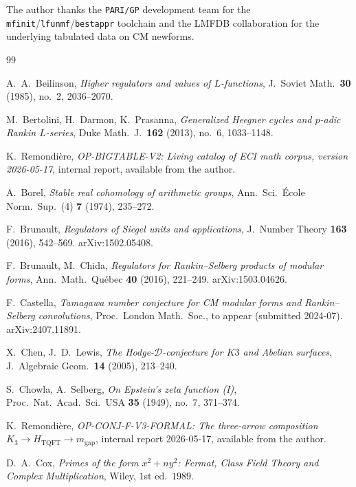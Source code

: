 \documentclass[11pt,a4paper]{amsart}
\theoremstyle{plain}
\theoremstyle{definition}
\begin{document}
The author thanks the \texttt{PARI/GP} development team for the
\texttt{mfinit}/\texttt{lfunmf}/\texttt{bestappr} toolchain and the
LMFDB collaboration for the underlying tabulated data on CM
newforms.

\begin{thebibliography}{99}

A.\ A.\ Beilinson,
\emph{Higher regulators and values of $L$-functions},
J.\ Soviet Math.\ \textbf{30} (1985), no.\ 2, 2036--2070.

M.\ Bertolini, H.\ Darmon, K.\ Prasanna,
\emph{Generalized Heegner cycles and $p$-adic Rankin $L$-series},
Duke Math.\ J.\ \textbf{162} (2013), no.\ 6, 1033--1148.

K.\ Remondi\`ere,
\emph{OP-BIGTABLE-V2: Living catalog of ECI math corpus, version
2026-05-17}, internal report, available from the author.

A.\ Borel,
\emph{Stable real cohomology of arithmetic groups},
Ann.\ Sci.\ \'Ecole Norm.\ Sup.\ (4) \textbf{7} (1974), 235--272.

F.\ Brunault,
\emph{Regulators of Siegel units and applications},
J.\ Number Theory \textbf{163} (2016), 542--569. arXiv:1502.05408.

F.\ Brunault, M.\ Chida,
\emph{Regulators for Rankin--Selberg products of modular forms},
Ann.\ Math.\ Qu\'ebec \textbf{40} (2016), 221--249. arXiv:1503.04626.

F.\ Castella,
\emph{Tamagawa number conjecture for CM modular forms and Rankin--Selberg
convolutions}, Proc.\ London Math.\ Soc., to appear (submitted 2024-07).
arXiv:2407.11891.

X.\ Chen, J.\ D.\ Lewis,
\emph{The Hodge-$\mathcal{D}$-conjecture for $K3$ and Abelian surfaces},
J.\ Algebraic Geom.\ \textbf{14} (2005), 213--240.

S.\ Chowla, A.\ Selberg,
\emph{On Epstein's zeta function (I)},
Proc.\ Nat.\ Acad.\ Sci.\ USA \textbf{35} (1949), no.\ 7, 371--374.

K.\ Remondi\`ere,
\emph{OP-CONJ-F-V3-FORMAL: The three-arrow composition
$K_3 \to H_{\mathrm{TQFT}} \to m_{\mathrm{gap}}$}, internal report
2026-05-17, available from the author.

D.\ A.\ Cox,
\emph{Primes of the form $x^2 + ny^2$: Fermat, Class Field Theory and
Complex Multiplication}, Wiley, $1$st ed.\ $1989$.


\end{thebibliography}
\end{document}
